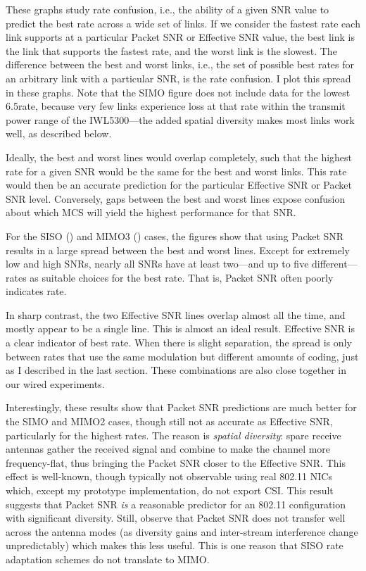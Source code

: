 These graphs study rate confusion, i.e., the ability of a given SNR value to predict the best rate across a wide set of links. If we consider the fastest rate each link supports at a particular Packet SNR or Effective SNR value, the best link is the link that supports the fastest rate, and the worst link is the slowest. The difference between the best and worst links, i.e., the set of possible best rates for an arbitrary link with a particular SNR, is the rate confusion. I plot this spread in these graphs. Note that the SIMO figure does not include data for the lowest 6.5\Mbps rate, because very few links experience loss at that rate within the transmit power range of the IWL5300---the added spatial diversity makes most links work well, as described below.

Ideally, the best and worst lines would overlap completely, such that the highest rate for a given SNR would be the same for the best and worst links. This rate would then be an accurate prediction for the particular Effective SNR or Packet SNR level. Conversely, gaps between the best and worst lines expose confusion about which MCS will yield the highest performance for that SNR.

For the SISO () and MIMO3 () cases, the figures show that using Packet SNR results in a large spread between the best and worst lines. Except for extremely low and high SNRs, nearly all SNRs have at least two---and up to five different---rates as suitable choices for the best rate. That is, Packet SNR often poorly indicates rate.

In sharp contrast, %
the two Effective SNR lines overlap almost all the time, and mostly appear to be a single line. This is almost an ideal result. Effective SNR is a clear indicator of best rate. When there is slight separation, the spread is only between rates that use the same modulation but different amounts of coding, just as I described in the last section. These combinations are also close together in our wired experiments. 

Interestingly, these results show that Packet SNR predictions are much better for the SIMO and MIMO2 cases, though still not as accurate as Effective SNR, particularly for the highest rates. The reason is \emph{spatial diversity}: spare receive antennas gather the received signal and combine to make the channel more frequency-flat, thus bringing the Packet SNR closer to the Effective SNR. This effect is well-known, though typically not observable using real 802.11 NICs which, except my prototype implementation, do not export CSI. This result suggests that Packet SNR \emph{is} a reasonable predictor for an 802.11 configuration with significant diversity. Still, observe that Packet SNR does not transfer well across the antenna modes (as diversity gains and inter-stream interference change unpredictably) which makes this less useful. This is one reason that SISO rate adaptation schemes do not translate to MIMO.


